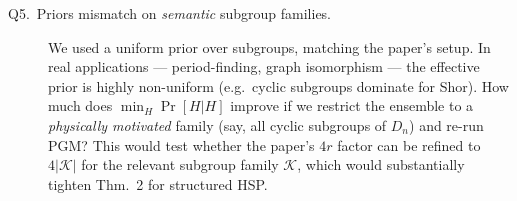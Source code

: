 \begin{description}
\item[Q5.\ Priors mismatch on \emph{semantic} subgroup families.]  We used a
  uniform prior over subgroups, matching the paper's setup.  In real
  applications --- period-finding, graph isomorphism --- the effective prior
  is highly non-uniform (e.g.\ cyclic subgroups dominate for Shor).
  How much does $\min_H \Pr[H|H]$ improve if we restrict the ensemble to a
  \emph{physically motivated} family (say, all cyclic subgroups of $D_n$)
  and re-run PGM?  This would test whether the paper's $4r$ factor can be
  refined to $4|\mathcal{K}|$ for the relevant subgroup family
  $\mathcal{K}$, which would substantially tighten Thm.~2 for structured
  HSP.
\end{description}
